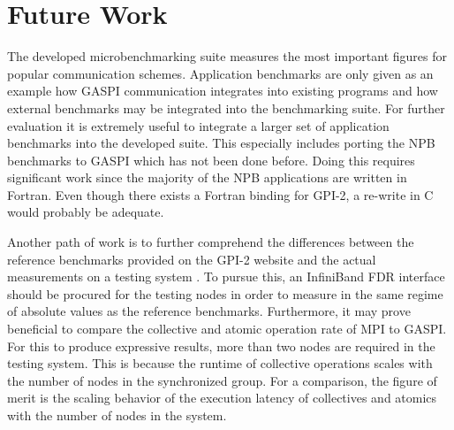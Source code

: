 \section{Future Work}

The developed microbenchmarking suite measures the most important figures for popular communication schemes. Application benchmarks are only given as an example how \ac{GASPI} communication integrates into existing programs and how external benchmarks may be integrated into the benchmarking suite. For further evaluation it is extremely useful to integrate a larger set of application benchmarks into the developed suite. This especially includes porting the \ac{NPB} benchmarks to \ac{GASPI} which has not been done before. Doing this requires significant work since the majority of the \ac{NPB} applications are written in Fortran. Even though there exists a Fortran binding for \ac{GPI}-2, a re-write in C would probably be adequate.

Another path of work is to further comprehend the differences between the reference benchmarks provided on the \ac{GPI}-2 website and the actual measurements on a testing system \cite{gpi-2-site}. To pursue this, an InfiniBand FDR interface should be procured for the testing nodes in order to measure in the same regime of absolute values as the reference benchmarks. Furthermore, it may prove beneficial to compare the collective and atomic operation rate of \ac{MPI} to \ac{GASPI}. For this to produce expressive results, more than two nodes are required in the testing system. This is because the runtime of collective operations scales with the number of nodes in the synchronized group. For a comparison, the figure of merit is the scaling behavior of the execution latency of collectives and atomics with the number of nodes in the system.




